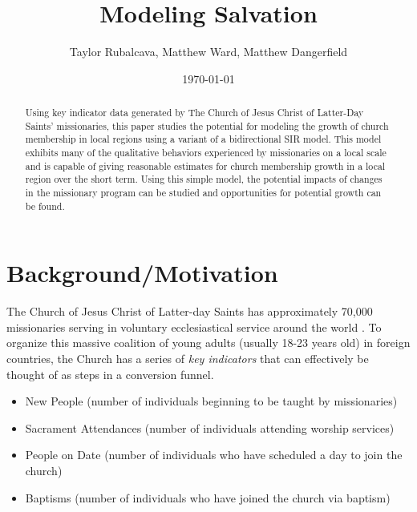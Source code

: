 \documentclass[11pt]{amsart}
\begin{document}
\title{Modeling Salvation}
\author{Taylor Rubalcava, Matthew Ward, Matthew  Dangerfield}

\date{\today} %

\begin{abstract}
Using key indicator data generated by The Church of Jesus Christ of Latter-Day Saints' missionaries, this paper studies the potential for modeling the growth of church membership in local regions using a variant of a bidirectional SIR model. This model exhibits many of the qualitative behaviors experienced by missionaries on a local scale and is capable of giving reasonable estimates for church membership growth in a local region over the short term. Using this simple model, the potential impacts of changes in the missionary program can be studied and opportunities for potential growth can be found.
\end{abstract}

\maketitle %

\section{Background/Motivation}

The Church of Jesus Christ of Latter-day Saints has approximately 70,000 missionaries serving in voluntary ecclesiastical service around the world \cite{ChurchNews}. To organize this massive coalition of young adults (usually 18-23 years old) in foreign countries, the Church has a series of \textit{key indicators} that can effectively be thought of as steps in a conversion funnel.

\begin{itemize}
  \item New People (number of individuals beginning to be taught by missionaries)
  \item Sacrament Attendances (number of individuals attending worship services)
  \item People on Date (number of individuals who have scheduled a day to join the church)
  \item Baptisms (number of individuals who have joined the church via baptism)
\end{itemize} \cite{PMG}
\end{document}
